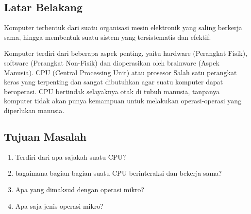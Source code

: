 \subsection{Latar Belakang}

Komputer terbentuk dari suatu organisasi mesin elektronik yang saling berkerja
sama, hingga membentuk suatu sistem yang tersistematis dan efektif.

Komputer terdiri dari beberapa aspek penting, yaitu hardware (Perangkat Fisik),
software (Perangkat Non-Fisik) dan dioperasikan oleh brainware (Aspek Manusia).
CPU (Central Processing Unit) atau prosesor Salah satu perangkat keras yang
terpenting dan sangat dibutuhkan agar suatu komputer dapat beroperasi. CPU
bertindak selayaknya otak di tubuh manusia, tanpanya komputer tidak akan punya
kemampuan untuk melakukan operasi-operasi yang diperlukan manusia.


\subsection{Tujuan Masalah}

\begin{enumerate}
  \item Terdiri dari apa sajakah suatu CPU?
  \item bagaimana bagian-bagian suatu CPU berinteraksi dan bekerja sama?
  \item Apa yang dimaksud dengan operasi mikro?
  \item Apa saja jenis operasi mikro?
\end{enumerate}
